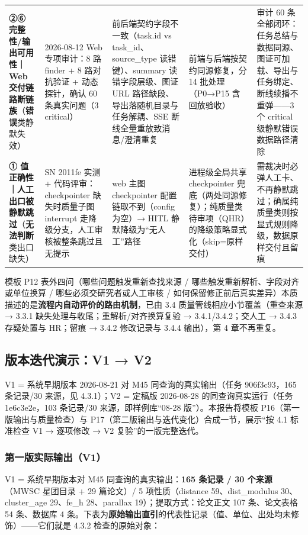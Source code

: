 \begin{longtable}{@{}p{2.4cm}p{3.0cm}p{3.0cm}p{3.4cm}p{3.2cm}@{}}
\textbf{②⑥ 完整性/输出可用性｜Web 交付链路断链族}（\textbf{错误}类静默失效） & 2026-08-12 Web 专项审计：8 路 finder + 8 路对抗验证 + 动态探针，确认 60 条真实问题（3 critical） & 前后端契约字段不一致（task.id vs task\_id、source\_type 读错键）、summary 读错字段层级、图证 URL 路径缺段、导出落随机目录与任务解耦、SSE 断线全量重放致消息/澄清重复 & 前端与后端按契约同源修复，分 14 批处理（P0→P15 含回放验收） & 审计 60 条全部闭环：任务总结与数据同源、图证可加载、导出与任务绑定、断线续播不重弹——3 个 critical 级静默错误数据路径清除 \\
\textbf{① 值正确性｜人工出口被静默跳过}（\textbf{无法判断}类出口缺失） & SN 2011fe 实测 + 代码评审：checkpointer 缺失时质量子图 interrupt 走降级分支，人工审核被整条跳过且无提示 & web 主图 checkpointer 配置链取不到（config 为空）→ HITL 静默降级为“无人工”路径 & 进程级全局共享 checkpointer 兜底（两处同源修复）；纯质量类待审项（QHR）的降级策略显式化（skip=原样交付） & 需裁决时必弹人工卡、不再静默跳过；确属纯质量类则按显式规则降级，数据原样交付且留痕 \\
\bottomrule
\end{longtable}

\noindent 模板 P12 表外四问（哪些问题触发重新查找来源 / 哪些触发重新解析、字段对齐或单位换算 / 哪些必须交研究者或人工审核 / 如何保留修正前后真实差异）本质描述的是\textbf{流程内自动评价的路由机制}，已由 3.4 质量管线相应小节覆盖（重查来源 → 3.3.1 缺失处理与收尾；重解析/对齐换算复验 → 3.4.1/3.4.2；交人工 → 3.4.3 存疑处置与 HR；留痕 → 3.4.2 修改记录与 3.4.4 输出），第 4 章不再重复。

\subsection{版本迭代演示：V1 → V2}

V1 = 系统早期版本 2026-08-21 对 M45 同查询的真实输出（任务 906f3c93，165 条记录/30 来源，见 4.3.1）；V2 = 定稿版 2026-08-28 的同查询真实运行（任务 1e6c3e2e，103 条记录/30 来源，即样例库“08-28 版”）。本报告将模板 P16（第一版输出与质量检查）与 P17（第二版输出与迭代变化）合成一节，展示“按 4.1 标准检查 V1 → 逐项修改 → V2 复验”的一版完整迭代。

\subsubsection{第一版实际输出（V1）}

V1 = 系统早期版本对 M45 同查询的真实输出：\textbf{165 条记录 / 30 个来源}（MWSC 星团目录 + 29 篇论文）/ 5 项性质（distance 59、dist\_modulus 30、cluster\_age 29、fe\_h 28、parallax 19）；提取方式：论文正文 107 条、论文表格 54 条、数据库 4 条。下表为\textbf{原始输出直引}的代表性记录（值、单位、出处均未修饰）——它们就是 4.3.2 检查的原始对象：

